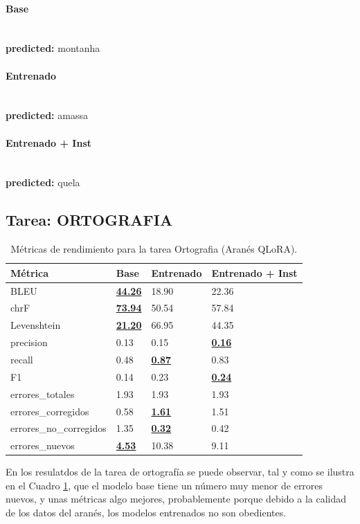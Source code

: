 \paragraph{Base}~\\
\textbf{predicted:} montanha

\paragraph{Entrenado}~\\
\textbf{predicted:} amassa

\paragraph{Entrenado + Inst}~\\
\textbf{predicted:} quela

\subsection{Tarea: ORTOGRAFIA}\label{tarea-ortografia}
\begin{longtable}[]{@{}llll@{}}
\toprule\noalign{}
Métrica & Base & Entrenado & Entrenado + Inst \\
\midrule\noalign{}
\endhead
\bottomrule\noalign{}
\caption{Métricas de rendimiento para la tarea Ortografia (Aranés QLoRA).}
\label{tab:metricas_ortografia_Aranés QLoRA}
\endlastfoot
BLEU & \textbf{\underline{44.26}} & 18.90 & 22.36 \\
chrF & \textbf{\underline{73.94}} & 50.54 & 57.84 \\
Levenshtein & \textbf{\underline{21.20}} & 66.95 & 44.35 \\
precision & 0.13 & 0.15 & \textbf{\underline{0.16}} \\
recall & 0.48 & \textbf{\underline{0.87}} & 0.83 \\
F1 & 0.14 & 0.23 & \textbf{\underline{0.24}} \\
errores\_totales & 1.93 & 1.93 & 1.93 \\
errores\_corregidos & 0.58 & \textbf{\underline{1.61}} & 1.51 \\
errores\_no\_corregidos & 1.35 & \textbf{\underline{0.32}} & 0.42 \\
errores\_nuevos & \textbf{\underline{4.53}} & 10.38 & 9.11 \\
\end{longtable}

En los resulatdos de la tarea de ortografía se puede observar, tal y como se ilustra en el Cuadro \ref{tab:metricas_ortografia_Aranés QLoRA}, que el modelo base tiene un número muy menor de errores nuevos, y unas métricas algo mejores, probablemente porque debido a la calidad de los datos del aranés, los modelos entrenados no son obedientes.

